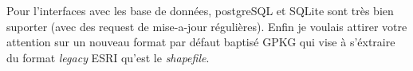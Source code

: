 \documentclass[a4paper, 11pt]{article}
\begin{document}
  Pour l'interfaces avec les base de données, postgreSQL et SQLite sont très bien suporter (avec des request de mise-a-jour régulières). Enfin je voulais attirer votre attention sur un nouveau format par défaut baptisé GPKG qui vise à s'éxtraire du format \textit{legacy} ESRI qu'est le \textit{shapefile}.
  \begin{figure} %
  \centering
    \\

\end{figure}
\end{document}
